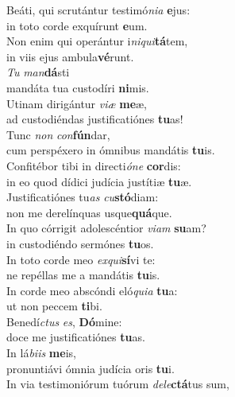 \evenverse Beáti, qui scrutántur testimó\textit{ni}\textit{a} \textbf{e}jus:~\*\\
\evenverse in toto corde exquírunt \textbf{e}um.\\
\oddverse Non enim qui operántur i\textit{ni}\textit{qui}\textbf{tá}tem,~\*\\
\oddverse in viis ejus ambula\textbf{vé}runt.\\
\evenverse \textit{Tu} \textit{man}\textbf{dá}sti~\*\\
\evenverse mandáta tua custodíri \textbf{ni}mis.\\
\oddverse Utinam dirigántur \textit{vi}\textit{æ} \textbf{me}æ,~\*\\
\oddverse ad custodiéndas justificatiónes \textbf{tu}as!\\
\evenverse Tunc \textit{non} \textit{con}\textbf{fún}dar,~\*\\
\evenverse cum perspéxero in ómnibus mandátis \textbf{tu}is.\\
\oddverse Confitébor tibi in directi\textit{ó}\textit{ne} \textbf{cor}dis:~\*\\
\oddverse in eo quod dídici judícia justítiæ \textbf{tu}æ.\\
\evenverse Justificatiónes tu\textit{as} \textit{cu}\textbf{stó}diam:~\*\\
\evenverse non me derelínquas usque\textbf{quá}que.\\
\oddverse In quo córrigit adolescéntior \textit{vi}\textit{am} \textbf{su}am?~\*\\
\oddverse in custodiéndo sermónes \textbf{tu}os.\\
\evenverse In toto corde meo \textit{ex}\textit{qui}\textbf{sí}vi te:~\*\\
\evenverse ne repéllas me a mandátis \textbf{tu}is.\\
\oddverse In corde meo abscóndi eló\textit{qui}\textit{a} \textbf{tu}a:~\*\\
\oddverse ut non peccem \textbf{ti}bi.\\
\evenverse Benedí\textit{ctus} \textit{es}, \textbf{Dó}mine:~\*\\
\evenverse doce me justificatiónes \textbf{tu}as.\\
\oddverse In lá\textit{bi}\textit{is} \textbf{me}is,~\*\\
\oddverse pronuntiávi ómnia judícia oris \textbf{tu}i.\\
\evenverse In via testimoniórum tuórum \textit{de}\textit{le}\textbf{ctá}tus sum,~\*\\
